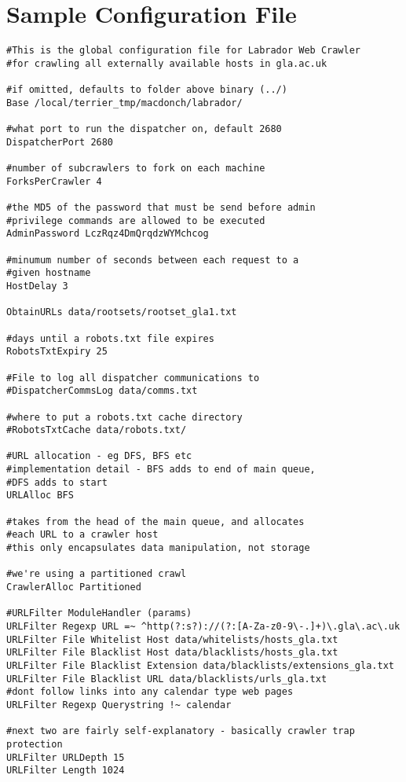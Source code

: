 \chapter{Sample Configuration File}\label{appndx-config}
\renewcommand{\baselinestretch}{1.0}
\begin{verbatim}
#This is the global configuration file for Labrador Web Crawler
#for crawling all externally available hosts in gla.ac.uk

#if omitted, defaults to folder above binary (../)
Base /local/terrier_tmp/macdonch/labrador/

#what port to run the dispatcher on, default 2680
DispatcherPort 2680

#number of subcrawlers to fork on each machine
ForksPerCrawler 4

#the MD5 of the password that must be send before admin
#privilege commands are allowed to be executed
AdminPassword LczRqz4DmQrqdzWYMchcog

#minumum number of seconds between each request to a
#given hostname
HostDelay 3

ObtainURLs data/rootsets/rootset_gla1.txt

#days until a robots.txt file expires
RobotsTxtExpiry 25

#File to log all dispatcher communications to 
#DispatcherCommsLog data/comms.txt

#where to put a robots.txt cache directory
#RobotsTxtCache data/robots.txt/

#URL allocation - eg DFS, BFS etc
#implementation detail - BFS adds to end of main queue,
#DFS adds to start
URLAlloc BFS

#takes from the head of the main queue, and allocates
#each URL to a crawler host
#this only encapsulates data manipulation, not storage

#we're using a partitioned crawl
CrawlerAlloc Partitioned

#URLFilter ModuleHandler (params)
URLFilter Regexp URL =~ ^http(?:s?)://(?:[A-Za-z0-9\-.]+)\.gla\.ac\.uk
URLFilter File Whitelist Host data/whitelists/hosts_gla.txt
URLFilter File Blacklist Host data/blacklists/hosts_gla.txt
URLFilter File Blacklist Extension data/blacklists/extensions_gla.txt
URLFilter File Blacklist URL data/blacklists/urls_gla.txt
#dont follow links into any calendar type web pages
URLFilter Regexp Querystring !~ calendar

#next two are fairly self-explanatory - basically crawler trap protection
URLFilter URLDepth 15 
URLFilter Length 1024



\end{verbatim}
